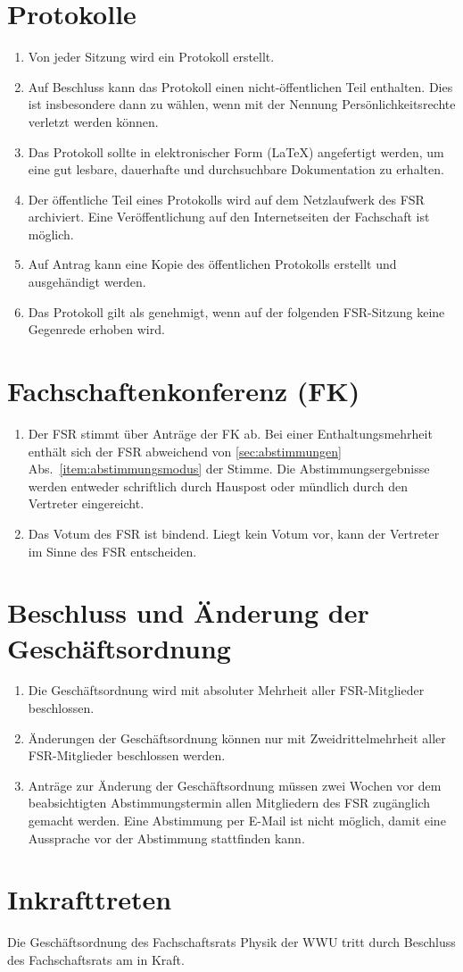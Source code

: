 \documentclass[
	a4paper,
	12pt,
	oneside,
	parskip=half-,
	pagesize,
	headsepline,
	german,
	ngerman
]{scrartcl}
\begin{document}
\section{Protokolle}
\label{sec:protokolle}
\begin{enumerate}
	\item Von jeder Sitzung wird ein Protokoll erstellt.
	\item Auf Beschluss kann das Protokoll einen nicht-öffentlichen Teil enthalten. Dies ist insbesondere dann zu wählen, wenn mit der Nennung Persönlichkeitsrechte verletzt werden können.
	\item Das Protokoll sollte in elektronischer Form (\LaTeX) angefertigt werden, um eine gut lesbare, dauerhafte und durchsuchbare Dokumentation zu erhalten.
	\item Der öffentliche Teil eines Protokolls wird auf dem Netzlaufwerk des FSR archiviert. Eine Veröffentlichung auf den Internetseiten der Fachschaft ist möglich.
	\item Auf Antrag kann eine Kopie des öffentlichen Protokolls erstellt und ausgehändigt werden.
	\item Das Protokoll gilt als genehmigt, wenn auf der folgenden FSR-Sitzung keine Gegenrede erhoben wird.
\end{enumerate}





\section{Fachschaftenkonferenz (FK)}
 \begin{enumerate}
  \item Der FSR stimmt über Anträge der FK ab. Bei einer Enthaltungsmehrheit enthält sich der FSR abweichend von \ref{sec:abstimmungen} Abs.\ \ref{item:abstimmungsmodus} der Stimme. Die Abstimmungsergebnisse werden entweder schriftlich durch Hauspost oder mündlich durch den Vertreter eingereicht.  
  \item Das Votum des FSR ist bindend. Liegt kein Votum vor, kann der Vertreter im Sinne des FSR entscheiden.
 \end{enumerate}

\section{Beschluss und Änderung der Geschäftsordnung} \label{sec:GO-Änderung}
\begin{enumerate}
	\item Die Geschäftsordnung wird mit absoluter Mehrheit aller FSR-Mitglieder beschlossen.
	\item Änderungen der Geschäftsordnung können nur mit Zweidrittelmehrheit aller FSR-Mitglieder beschlossen werden.
	\item Anträge zur Änderung der Geschäftsordnung müssen zwei Wochen vor dem beabsichtigten Abstimmungstermin allen Mitgliedern des FSR zugänglich gemacht werden. Eine Abstimmung per E-Mail ist nicht möglich, damit eine Aussprache vor der Abstimmung stattfinden kann.
\end{enumerate}

\section{Inkrafttreten}
Die Geschäftsordnung des Fachschaftsrats Physik der WWU tritt durch Beschluss des Fachschaftsrats am  in Kraft.
\end{document}
